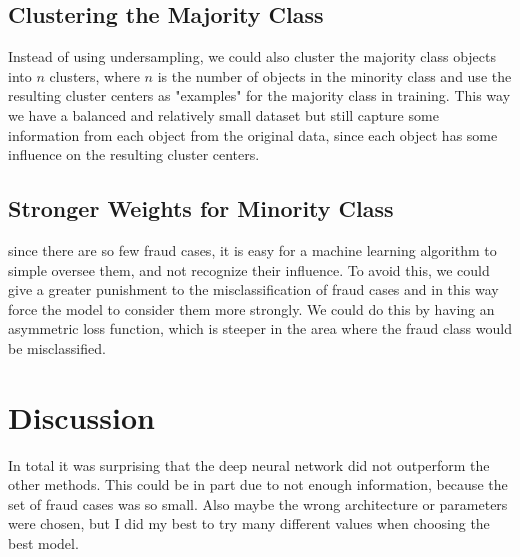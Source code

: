 \documentclass[utf8x]{ctexart}
\begin{document}
\subsection{Clustering the Majority Class}
Instead of using undersampling, we could also cluster the majority class objects into $n$ clusters, where $n$ is the number of objects in the minority class and use the resulting cluster centers as "examples" for the majority class in training. This way we have a balanced and relatively small dataset but still capture some information from each object from the original data, since each object has some influence on the resulting cluster centers.

\subsection{Stronger Weights for Minority Class}

since there are so few fraud cases, it is easy for a machine learning algorithm to simple oversee them, and not recognize their influence. To avoid this, we could give a greater punishment to the misclassification of fraud cases and in this way force the model to consider them more strongly. We could do this by having an asymmetric loss function, which is steeper in the area where the fraud class would be misclassified.


\section{Discussion}

In total it was surprising that the deep neural network did not outperform the other methods. This could be in part due to not enough information, because the set of fraud cases was so small. Also maybe the wrong architecture or parameters were chosen, but I did my best to try many different values when choosing the best model.

% 
% 
\end{document}
